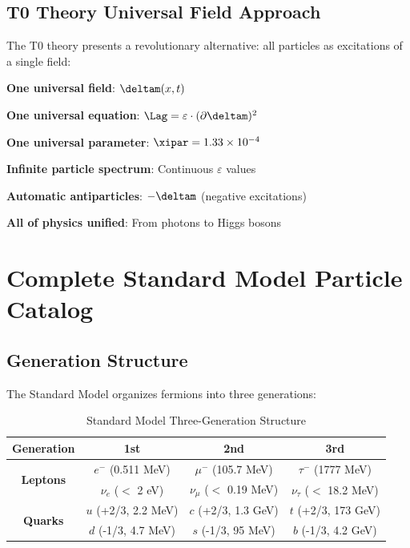 	\subsection{T0 Theory Universal Field Approach}
	
	The T0 theory presents a revolutionary alternative: all particles as excitations of a single field:
	
	\begin{tcolorbox}[colback=blue!5!white,colframe=blue!75!black,title=T0 Universal Field Simplification]
		\textbf{One universal field}: $\deltam(x,t)$
		
		\textbf{One universal equation}: $\Lag = \varepsilon \cdot (\partial \deltam)^2$
		
		\textbf{One universal parameter}: $\xipar = 1.33 \times 10^{-4}$
		
		\textbf{Infinite particle spectrum}: Continuous $\varepsilon$ values
		
		\textbf{Automatic antiparticles}: $-\deltam$ (negative excitations)
		
		\textbf{All of physics unified}: From photons to Higgs bosons
	\end{tcolorbox}
	
	\section{Complete Standard Model Particle Catalog}
	
	\subsection{Generation Structure}
	
	The Standard Model organizes fermions into three generations:
	
	\begin{table}[htbp]
		\centering
		\begin{tabular}{|c|c|c|c|}
			\hline
			\textbf{Generation} & \textbf{1st} & \textbf{2nd} & \textbf{3rd} \\
			\hline
			\hline
			\multirow{2}{*}{\textbf{Leptons}} & $e^-$ (0.511 MeV) & $\mu^-$ (105.7 MeV) & $\tau^-$ (1777 MeV) \\
			& $\nu_e$ ($<$ 2 eV) & $\nu_\mu$ ($<$ 0.19 MeV) & $\nu_\tau$ ($<$ 18.2 MeV) \\
			\hline
			\multirow{2}{*}{\textbf{Quarks}} & $u$ (+2/3, 2.2 MeV) & $c$ (+2/3, 1.3 GeV) & $t$ (+2/3, 173 GeV) \\
			& $d$ (-1/3, 4.7 MeV) & $s$ (-1/3, 95 MeV) & $b$ (-1/3, 4.2 GeV) \\
			\hline
		\end{tabular}
		\caption{Standard Model Three-Generation Structure}
		\label{tab:sm_generations}
	\end{table}
	
